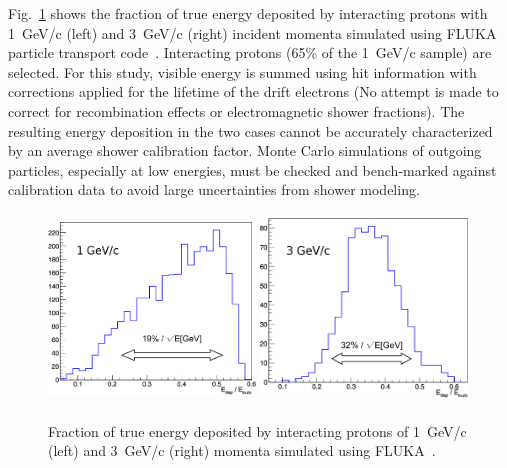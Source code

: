 Fig.~\ref{fig:hadronshwr} shows the fraction of true energy deposited by interacting protons with 1~GeV/c (left) and
3~GeV/c (right) incident momenta simulated using FLUKA particle transport code~\cite{fluka05}. 
Interacting protons (65\% of the 1~GeV/c sample) are selected.
For this study, visible energy is summed using hit information with corrections applied for the lifetime of 
the drift electrons (No attempt is made to correct for recombination effects or electromagnetic shower fractions). 
The resulting energy deposition in the two cases cannot be 
accurately characterized by an average shower calibration factor. Monte Carlo simulations of 
outgoing particles, especially at low energies, must be checked and bench-marked against calibration data to avoid
large uncertainties from shower modeling. 
\begin{figure}[h!]
  \centering
\includegraphics[width=0.49\textwidth,height=5.0cm]{figures/pr1GeV_1}
\includegraphics[width=0.49\textwidth,height=5.0cm]{figures/pr3GeV_1}
\label{fig:hadronshwr}
  \caption{Fraction of true energy deposited by interacting protons of 1~GeV/c (left) and
3~GeV/c (right) momenta simulated using FLUKA~\cite{fluka05}.
}
\label{fig:hadronshwr}
\end{figure}

